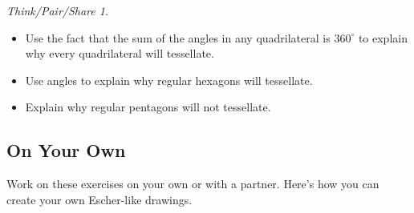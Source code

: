 \documentclass[12pt, reqno]{amsart}
\theoremstyle{remark}
\newtheorem*{thinkpair*}{Think/Pair/Share}
\theoremstyle{definition}
\numberwithin{equation}{section}  %
\begin{document}
\bigskip
\bigskip

\begin{thinkpair*}\ 
\begin{itemize}
\item
Use the fact that the sum of the angles in any quadrilateral is $360^\circ$ to explain why every quadrilateral will tessellate.  \\

\item
Use angles to explain why regular hexagons will tessellate.\\

\item
Explain why regular pentagons will not tessellate.\\
\end{itemize}
\end{thinkpair*}

\bigskip
\bigskip

\subsection*{On Your Own}
Work on these exercises on your own or with a partner.
Here's how you can create your own Escher-like drawings.


\bigskip
\end{document}
